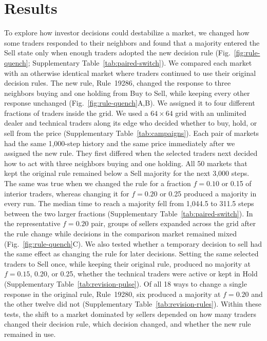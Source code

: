 \section{Results}

To explore how investor decisions could destabilize a market, we changed how
some traders responded to their neighbors and found that a majority entered
the Sell state only when enough traders adopted the new decision rule
(Fig.~\ref{fig:rule-quench}; Supplementary Table~\ref{tab:paired-switch}). We compared each market with an otherwise
identical market where traders continued to use their original decision
rules. The new rule, Rule~19286, changed the response to three neighbors buying
and one holding from Buy to Sell, while keeping every other response
unchanged (Fig.~\ref{fig:rule-quench}A,B). We assigned it to four different
fractions of traders inside the grid. We
used a $64\times64$ grid with an unlimited dealer and technical traders along
its edge who decided whether to buy, hold, or sell from the price
(Supplementary Table~\ref{tab:campaigns}). Each pair of markets had the same
1,000-step history and the same price immediately after we assigned the new
rule. They first differed when the selected traders next decided how to act
with three neighbors buying and one holding. All 50 markets that kept the
original rule remained below a Sell majority for the next 3,000 steps. The
same was true when we changed the rule for a fraction $f=0.10$ or 0.15 of
interior traders, whereas changing it for $f=0.20$ or 0.25 produced a
majority in every run. The median time to reach a majority fell from 1,044.5
to 311.5 steps between the two larger fractions
(Supplementary Table~\ref{tab:paired-switch}).
In the representative $f=0.20$ pair, groups of sellers expanded across the
grid after the rule change while decisions in the comparison market remained
mixed (Fig.~\ref{fig:rule-quench}C). We also tested whether a temporary
decision to sell had the same effect as changing the rule for later
decisions. Setting the same selected traders to Sell once, while keeping
their original rule, produced no majority at $f=0.15$, 0.20, or 0.25,
whether the technical traders were active or kept in Hold (Supplementary
Table~\ref{tab:revision-pulse}). Of all 18 ways to change a single response
in the original rule, Rule~19280, six produced a majority at $f=0.20$ and
the other twelve did not (Supplementary Table~\ref{tab:revision-rules}).
Within these tests, the shift to a market dominated by sellers depended on
how many traders changed their decision rule, which decision changed, and
whether the new rule remained in use.


